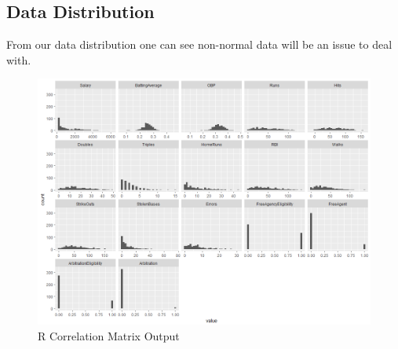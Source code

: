 \documentclass[a4paper, 11pt]{article}
\begin{document}
\subsection*{Data Distribution}
From our data distribution one can see non-normal data will be an issue to deal with.
\vspace{-1em}
\begin{figure}[H]
	\centering
	\caption{R Correlation Matrix Output}
	\centerline{\includegraphics[width=7in]{data_distribution.png}}
\end{figure}
\end{document}
